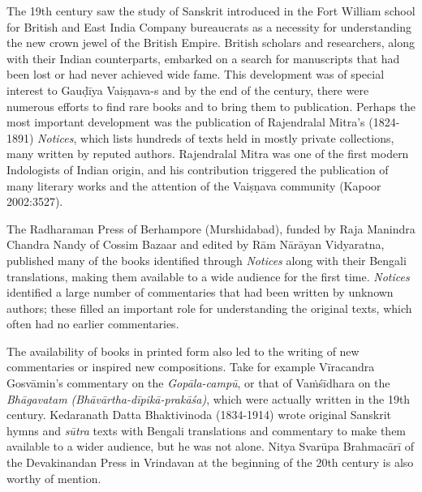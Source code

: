 The 19th century saw the study of Sanskrit introduced in the Fort William school for British and East India Company bureaucrats as a necessity for understanding the new crown jewel of the British Empire. British scholars and researchers, along with their Indian counterparts, embarked on a search for manuscripts that had been lost or had never achieved wide fame. This development was of special interest to Gauḍīya Vaiṣṇava-s and by the end of the century, there were numerous efforts to find rare books and to bring them to publication. Perhaps the most important development was the publication of Rajendralal Mitra's (1824-1891) {\sl Notices}, which lists hundreds of texts held in mostly private collections, many written by reputed authors. Rajendralal Mitra was one of the first modern Indologists of Indian origin, and his contribution triggered the publication of many literary works and the attention of the Vaiṣṇava community (Kapoor 2002:3527). 

The Radharaman Press of Berhampore (Murshidabad), funded by Raja Manindra Chandra Nandy of Cossim Bazaar and edited by Rām Nārāyan Vidyaratna, published many of the books identified through {\sl Notices} along with their Bengali translations, making them available to a wide audience for the first time. {\sl Notices} identified a large number of commentaries that had been written by unknown authors; these filled an important role for understanding the original texts, which often had no earlier commentaries. 

The availability of books in printed form also led to the writing of new commentaries or inspired new compositions. Take for example Vīracandra Gosvāmin's commentary on the {\sl Gopāla-campū}, or that of Vaṁśīdhara on the {\sl Bhāgavatam (Bhāvārtha-dīpikā-prakāśa)}, which were actually written in the 19th century. Kedaranath Datta Bhaktivinoda (1834-1914) wrote original Sanskrit hymns and {\sl sūtra} texts with Bengali translations and commentary to make them available to a wider audience, but he was not alone. Nitya Svarūpa Brahmacārī of the Devakinandan Press in Vrindavan at the beginning of the 20th century is also worthy of mention. 
\vskip 2pt

